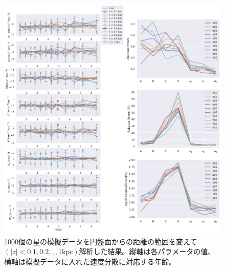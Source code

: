 \begin{figure}[htbp]
	\centering
	\includegraphics[width=15cm]{fig/Mock_z.pdf}
	\caption{1000個の星の模擬データを円盤面からの距離の範囲を変えて$(|z|<0.1,0.2,,,1 \mathrm{kpc})$解析した結果。縦軸は各パラメータの値、横軸は模擬データに入れた速度分散に対応する年齢。} \label{fig:Mock_z}
\end{figure}


